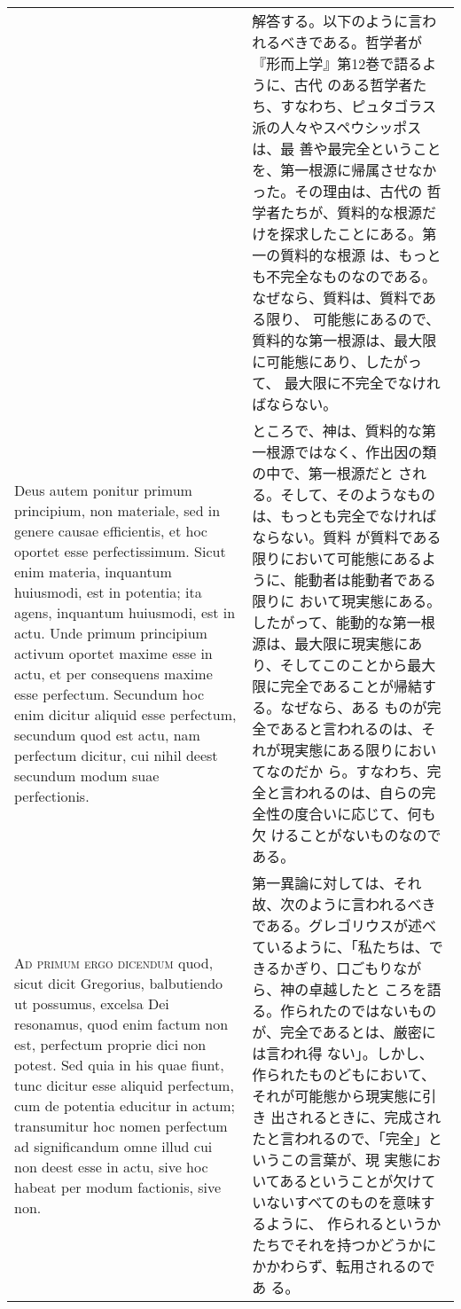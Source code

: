 \documentclass[10pt]{jsarticle} %
\begin{document}
\begin{longtable}{p{21em}p{21em}}
&

解答する。以下のように言われるべきである。哲学者が『形而上学』第12巻で語るように、古代
 のある哲学者たち、すなわち、ピュタゴラス派の人々やスペウシッポスは、最
 善や最完全ということを、第一根源に帰属させなかった。その理由は、古代の
 哲学者たちが、質料的な根源だけを探求したことにある。第一の質料的な根源
 は、もっとも不完全なものなのである。なぜなら、質料は、質料である限り、
 可能態にあるので、質料的な第一根源は、最大限に可能態にあり、したがって、
 最大限に不完全でなければならない。


\\

Deus autem ponitur primum principium, non materiale, sed in genere
 causae efficientis, et hoc oportet esse perfectissimum. Sicut enim
 materia, inquantum huiusmodi, est in potentia; ita agens, inquantum
 huiusmodi, est in actu. Unde primum principium activum oportet maxime
 esse in actu, et per consequens maxime esse perfectum. Secundum hoc
 enim dicitur aliquid esse perfectum, secundum quod est actu, nam
 perfectum dicitur, cui nihil deest secundum modum suae perfectionis.

&

ところで、神は、質料的な第一根源ではなく、作出因の類の中で、第一根源だと
 される。そして、そのようなものは、もっとも完全でなければならない。質料
 が質料である限りにおいて可能態にあるように、能動者は能動者である限りに
 おいて現実態にある。したがって、能動的な第一根源は、最大限に現実態にあ
 り、そしてこのことから最大限に完全であることが帰結する。なぜなら、ある
 ものが完全であると言われるのは、それが現実態にある限りにおいてなのだか
 ら。すなわち、完全と言われるのは、自らの完全性の度合いに応じて、何も欠
 けることがないものなのである。

\\


{\scshape Ad primum ergo dicendum} quod, sicut dicit Gregorius,
 balbutiendo ut possumus, excelsa Dei resonamus, quod enim factum non
 est, perfectum proprie dici non potest. Sed quia in his quae fiunt,
 tunc dicitur esse aliquid perfectum, cum de potentia educitur in actum;
 transumitur hoc nomen perfectum ad significandum omne illud cui non
 deest esse in actu, sive hoc habeat per modum factionis, sive non.
&
第一異論に対しては、それ故、次のように言われるべきである。グレゴリウスが述べ
 ているように、「私たちは、できるかぎり、口ごもりながら、神の卓越したと
 ころを語る。作られたのではないものが、完全であるとは、厳密には言われ得
 ない」。しかし、作られたものどもにおいて、それが可能態から現実態に引き
 出されるときに、完成されたと言われるので、「完全」というこの言葉が、現
 実態においてあるということが欠けていないすべてのものを意味するように、
 作られるというかたちでそれを持つかどうかにかかわらず、転用されるのであ
 る。



\end{longtable}
\end{document}
